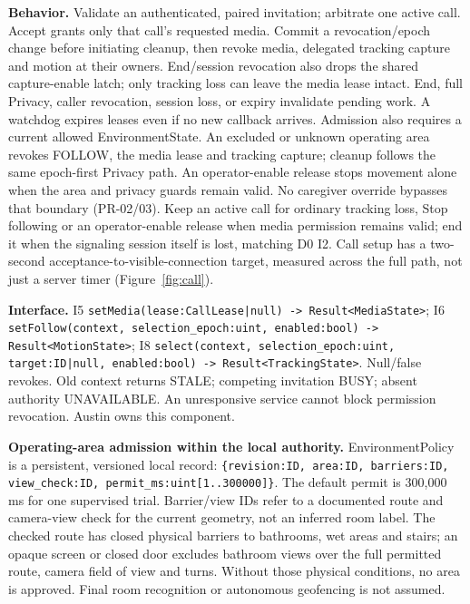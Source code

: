 \documentclass[12pt,letterpaper]{article}
\newcommand{\field}[1]{\texttt{#1}}
\begin{document}
\textbf{Behavior.} Validate an authenticated, paired invitation; arbitrate one active call. Accept grants only that call's requested media. Commit a revocation/epoch change before initiating cleanup, then revoke media, delegated tracking capture and motion at their owners. End/session revocation also drops the shared capture-enable latch; only tracking loss can leave the media lease intact. End, full Privacy, caller revocation, session loss, or expiry invalidate pending work. A watchdog expires leases even if no new callback arrives. Admission also requires a current allowed EnvironmentState. An excluded or unknown operating area revokes FOLLOW, the media lease and tracking capture; cleanup follows the same epoch-first Privacy path. An operator-enable release stops movement alone when the area and privacy guards remain valid. No caregiver override bypasses that boundary (PR-02/03). Keep an active call for ordinary tracking loss, Stop following or an operator-enable release when media permission remains valid; end it when the signaling session itself is lost, matching D0 I2. Call setup has a two-second acceptance-to-visible-connection target, measured across the full path, not just a server timer (Figure~\ref{fig:call}).

\textbf{Interface.} I5 \field{setMedia(lease:CallLease|null) -> Result<MediaState>}; I6 \field{setFollow(context, selection\_\allowbreak{}epoch:uint, enabled:bool) -> Result<MotionState>}; I8 \field{select(context, selection\_\allowbreak{}epoch:uint, target:ID|null, enabled:bool) -> Result<TrackingState>}. Null/false revokes. Old context returns STALE; competing invitation BUSY; absent authority UNAVAILABLE. An unresponsive service cannot block permission revocation. Austin owns this component.

\textbf{Operating-area admission within the local authority.} EnvironmentPolicy is a persistent, versioned local record: \field{\{revision:ID, area:ID, barriers:ID, view\_\allowbreak{}check:ID, permit\_\allowbreak{}ms:uint[1..300000]\}}. The default permit is 300,000 ms for one supervised trial. Barrier/view IDs refer to a documented route and camera-view check for the current geometry, not an inferred room label. The checked route has closed physical barriers to bathrooms, wet areas and stairs; an opaque screen or closed door excludes bathroom views over the full permitted route, camera field of view and turns. Without those physical conditions, no area is approved. Final room recognition or autonomous geofencing is not assumed.
\end{document}
